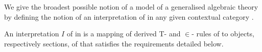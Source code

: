 \newcommand{\gatdisplayrule}[2]
{
\setlength{\fboxsep}{1pt}
\setlength{\fboxrule}{0pt}
\fbox{$\displaystyle \frac{#1}{#2}$}
}
\newcommand{\Isort}{I_{sort}}
\newcommand{\Iop}{I_{op}}
\newcommand {\Ihat}{\hat{I}}

\renewcommand{\crossx}[3]{#1 \underset{\tiny #3}{\cross} #2}
\newcommand{\fonestar}   {{f_1}\kern-.15em^*}
\newcommand{\ftwostar}   {{f_2}\kern-.15em^*}
\newcommand{\fjstar}     {{f_j}\kern-.2em^*}
\newcommand{\fjpstar}    {{f_{j-1}}\kern-.25em^*}
\newcommand{\smstar}{{s_m}\kern-.25em^*}
\newcommand{\sonestar}{{s_1}\kern-.15em^*}


\note
We give the broadest possible notion of a model
of a generalised algebraic theory \gatUw by defining the notion of an interpretation of  \gatUw in  any given contextual category \catc.

\note 
An interpretation $I$ of \gatUw in \catcw is a  mapping 
of derived T- and $\in$- rules of \gatUw to objects, respectively sections, of \gatUw that satisfies the requirements detailed below.


